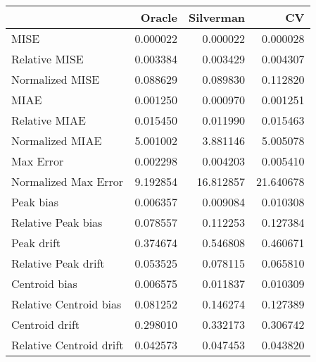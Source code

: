 \begin{tabular}{lrrr}
  \hline
 & Oracle & Silverman & CV \\ 
  \hline
MISE & 0.000022 & 0.000022 & 0.000028 \\ 
  Relative MISE & 0.003384 & 0.003429 & 0.004307 \\ 
  Normalized MISE & 0.088629 & 0.089830 & 0.112820 \\ 
  MIAE & 0.001250 & 0.000970 & 0.001251 \\ 
  Relative MIAE & 0.015450 & 0.011990 & 0.015463 \\ 
  Normalized MIAE & 5.001002 & 3.881146 & 5.005078 \\ 
  Max Error & 0.002298 & 0.004203 & 0.005410 \\ 
  Normalized Max Error & 9.192854 & 16.812857 & 21.640678 \\ 
  Peak bias & 0.006357 & 0.009084 & 0.010308 \\ 
  Relative Peak bias & 0.078557 & 0.112253 & 0.127384 \\ 
  Peak drift & 0.374674 & 0.546808 & 0.460671 \\ 
  Relative Peak drift & 0.053525 & 0.078115 & 0.065810 \\ 
  Centroid bias & 0.006575 & 0.011837 & 0.010309 \\ 
  Relative Centroid bias & 0.081252 & 0.146274 & 0.127389 \\ 
  Centroid drift & 0.298010 & 0.332173 & 0.306742 \\ 
  Relative Centroid drift & 0.042573 & 0.047453 & 0.043820 \\ 
   \hline
\end{tabular}
